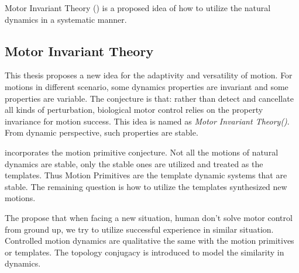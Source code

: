 Motor Invariant Theory (\moit) is a proposed idea of how to utilize the natural dynamics in a systematic manner.








\subsection{Motor Invariant Theory}
%
%
%





This thesis proposes a new idea for the adaptivity and versatility of motion.
For motions in different scenario, some dynamics properties are invariant and some properties are variable.
The conjecture is that: rather than detect and cancellate all kinds of perturbation, biological motor control relies on the property invariance for motion success.
This idea is named as \emph{Motor Invariant Theory(\moit)}.
From dynamic perspective, such properties are stable.

\moit incorporates the motion primitive conjecture. 
Not all the motions of natural dynamics are stable, only the stable ones are utilized and treated as the templates.
Thus Motion Primitives are the template dynamic systems that are stable.
The remaining question is how to utilize the templates synthesized new motions.

The \moit propose that when facing a new situation, human don't solve motor control from ground up,
we try to utilize  successful experience in similar situation.
Controlled motion dynamics are qualitative the same with the motion primitives or templates.
The topology conjugacy is introduced to model the similarity in dynamics.

